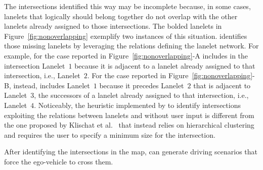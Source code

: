 \documentclass[conference]{IEEEtran}
\begin{document}
The intersections identified this way may be incomplete because, in some cases, lanelets that logically should belong together do not overlap with the other lanelets already assigned to those intersections. The bolded lanelets in Figure~\ref{fig:nonoverlapping} exemplify two instances of this situation. \tool identifies those missing lanelets by leveraging the relations defining the lanelet network. For example, for the case reported in \mbox{Figure~\ref{fig:nonoverlapping}-A} \tool includes in the intersection Lanelet~$1$ because it is adjacent to a lanelet already assigned to that intersection, i.e., Lanelet~$2$. For the case reported in \mbox{Figure~\ref{fig:nonoverlapping}-B}, instead, \tool includes Lanelet~$1$ because it precedes Lanelet~$2$ that is adjacent to Lanelet~$3$, the successors of a lanelet already assigned to that intersection, i.e., Lanelet~$4$. 
%
Noticeably, the heuristic implemented by \tool to identify intersections exploiting the relations between lanelets and without user input is different from the one proposed by Klischat et al.~\cite{DBLP:conf/itsc/KlischatLHA20} that instead relies on hierarchical clustering and requires the user to specify a minimum size for the intersection.

After identifying the intersections in the map, \tool can generate driving scenarios that force the ego-vehicle to cross them.
\end{document}
